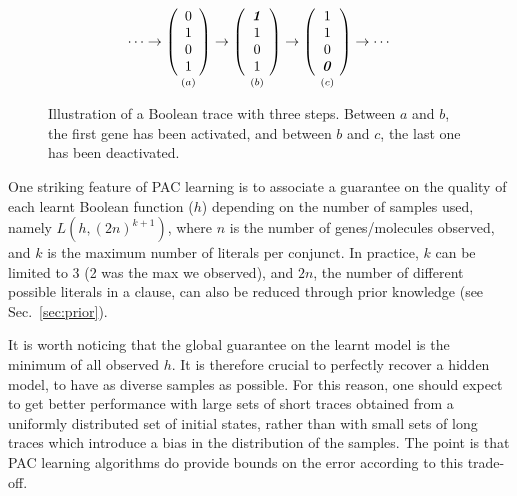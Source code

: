 \documentclass{llncs}
\begin{document}
\begin{figure}[htbp]
   {\large 
      \[
         \cdots
         \rightarrow
         \underset{\vspace{1em}(a)}{
            \left(\begin{array}{c}
                  0\\ 1\\ 0\\ 1
         \end{array}\right)}
         \rightarrow
         \underset{\vspace{1em}(b)}{
            \left(\begin{array}{c}
                  \textbf{\textit{1}}\\ 1\\ 0\\ 1
         \end{array}\right)}
         \rightarrow
         \underset{\vspace{1em}(c)}{
            \left(\begin{array}{c}
                  1\\ 1\\ 0\\ \textbf{\textit 0}
         \end{array}\right)}
         \rightarrow
         \cdots
      \]
   }
   \caption{Illustration of a Boolean trace with three steps. Between $a$ and
   $b$, the first gene has been activated, and between $b$ and $c$, the last
   one has been deactivated.}\label{steps}
\end{figure}



One striking feature of PAC learning is to associate a guarantee on the quality of each learnt Boolean
function ($h$) depending on the number of samples used, namely $L(h, (2n)^{k+1})$,
where $n$ is the number of genes/molecules observed, and $k$ is the maximum number of literals per conjunct.
In practice, $k$ can be limited to 3 (2 was the max we observed), and $2n$, the
number of different possible literals in a clause, can also be reduced through
prior knowledge (see Sec.~\ref{sec:prior}).

It is worth noticing that the global guarantee on the learnt model is the minimum of all observed $h$.
It is therefore crucial to perfectly recover a hidden model, to have as diverse samples as possible. 
For this reason, one should expect to get better performance 
with large sets of short traces obtained from a uniformly distributed set of initial states,
rather than with small sets of long traces which introduce a bias in the distribution of the samples.
The point is that PAC learning algorithms do provide bounds on the error according to this trade-off.
\end{document}

